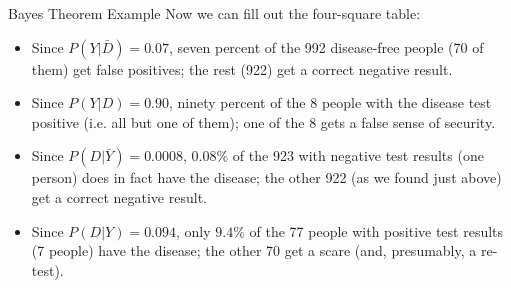 \begin{frame}{Bayes Theorem  Example }
Now we can fill out the four-square table:
\begin{itemize}

\item Since $P(Y|\bar{D})=0.07$, seven percent of the 992 disease-free people (70
of them) get false positives; the rest (922) get a correct negative result.


\item Since $P(Y|D)=0.90$, ninety percent of the 8 people with the disease test
positive (i.e. all but one of them); one of the 8 gets a false sense of security.

\item Since $P(D|\bar{Y})=0.0008$, $0.08\%$ of the 923 with negative test results
(one person) does in fact have the disease; the other 922 (as we found just above)
get a correct negative result.

\item Since $P(D|Y)=0.094$, only $9.4\%$ of the 77 people with positive test
results (7 people) have the disease; the other 70 get a scare (and, presumably,
a re-test).

\end{itemize}
\end{frame}



